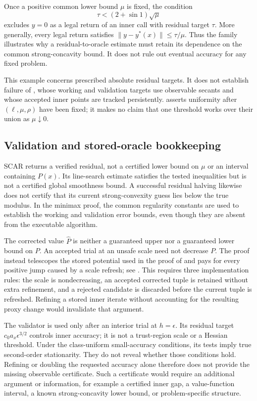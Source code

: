 \documentclass{article}
\begin{document}
Once a positive common lower bound $\mu$ is fixed, the condition
\[
 \tau<(2+\sin1)\sqrt\mu
\]
excludes $y=0$ as a legal return of an inner call with residual target
$\tau$.  More generally, every legal return satisfies
$\|y-y^*(x)\|\le\tau/\mu$.  Thus the family illustrates why a
residual-to-oracle estimate must retain its dependence on the common
strong-concavity bound.  It does not rule out eventual accuracy for
any fixed problem.

This example concerns prescribed absolute residual targets.  It does
not establish failure of , whose
working and validation targets use observable secants and whose
accepted inner points are tracked persistently.
 asserts uniformity after
$(\ell,\mu,\rho)$ have been fixed; it makes no claim that one threshold
works over their union as $\mu\downarrow0$.

\subsection{Validation and stored-oracle bookkeeping}

SCAR returns a verified residual, not a certified lower bound on
$\mu$ or an interval containing $P(x)$.  Its line-search estimate
satisfies the tested inequalities but is not a certified global
smoothness bound.  A successful residual halving likewise does not
certify that its current strong-convexity guess lies below the true
modulus.  In the minimax proof, the common regularity constants are
used to establish the working and validation error bounds, even though
they are absent from the executable algorithm.

The corrected value $\widehat P$ is neither a guaranteed upper nor a
guaranteed lower bound on $P$.  An accepted trial at an unsafe scale
need not decrease $P$.  The proof instead telescopes the stored
potential used in the proof of  and
pays for every positive jump caused by a scale refresh; see
.
This requires three implementation rules: the scale is nondecreasing,
an accepted corrected tuple is retained without extra refinement,
and a rejected candidate is discarded before the current tuple is
refreshed.  Refining a stored inner iterate without accounting for
the resulting proxy change would invalidate that argument.

The validator is used only after an interior trial at $h=\epsilon$.
Its residual target $c_0a_x\epsilon^{3/2}$ controls inner accuracy;
it is not a trust-region scale or a Hessian threshold.  Under the
class-uniform small-accuracy conditions, its tests imply true
second-order stationarity.  They do not reveal whether those
conditions hold.  Refining or doubling the requested accuracy alone
therefore does not provide the missing observable certificate.
Such a certificate would require an additional argument or information,
for example a certified inner gap, a value-function interval, a
known strong-concavity lower bound, or problem-specific structure.
\end{document}
